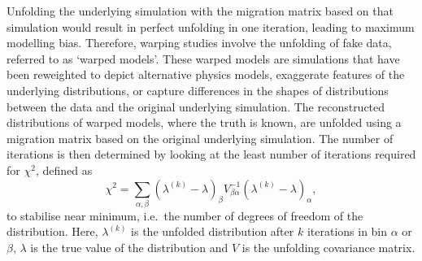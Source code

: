 Unfolding the underlying simulation with the migration matrix based on that simulation would result in perfect unfolding in one iteration, leading to maximum modelling bias. Therefore, warping studies involve the unfolding of fake data, referred to as `warped models'. These warped models are simulations that have been reweighted to depict alternative physics models, exaggerate features of the underlying distributions, or capture differences in the shapes of distributions between the data and the original underlying simulation. The reconstructed distributions of warped models, where the truth is known, are unfolded using a migration matrix based on the original underlying simulation. The number of iterations is then determined by looking at the least number of iterations required for $\chi^2$, defined as 
\begin{equation}
    \label{eq:unfolding}
    \chi^2= \sum_{\alpha, \beta} \left( \lambda^{(k)}-\lambda \right)_{\beta}V^{-1}_{\beta\alpha}\left( \lambda^{(k)}-\lambda \right)_{\alpha},
\end{equation}
to stabilise near minimum, i.e.~the number of degrees of freedom of the distribution. Here, $ \lambda^{(k)}$ is the unfolded distribution after $k$ iterations in bin $\alpha$ or $\beta$, $\lambda$ is the true value of the distribution and $V$ is the unfolding covariance matrix.

